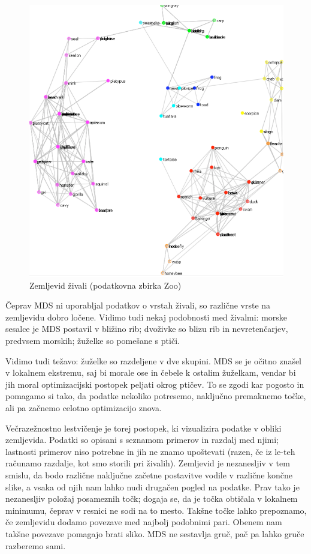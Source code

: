 \begin{figure}[tbp]
\begin{center}
\includegraphics{slike/zoo-mds.pdf}
\caption{Zemljevid živali (podatkovna zbirka Zoo)}
\label{f-zoo-mds}
\end{center}
\end{figure}

Čeprav MDS ni uporabljal podatkov o vrstah živali, so različne vrste na zemljevidu dobro ločene. Vidimo tudi nekaj podobnosti med živalmi: morske sesalce je MDS postavil v bližino rib; dvoživke so blizu rib in nevretenčarjev, predvsem morskih; žuželke so pomešane s ptiči.

Vidimo tudi težavo: žuželke so razdeljene v dve skupini. MDS se je očitno znašel v lokalnem ekstremu, saj bi morale ose in čebele k ostalim žuželkam, vendar bi jih moral optimizacijski postopek peljati okrog ptičev. To se zgodi kar pogosto in pomagamo si tako, da podatke nekoliko potresemo, naključno premaknemo točke, ali pa začnemo celotno optimizacijo znova.

Večrazežnostno lestvičenje je torej postopek, ki vizualizira podatke v obliki zemljevida. Podatki so opisani s seznamom primerov in razdalj med njimi; lastnosti primerov niso potrebne in jih ne znamo upoštevati (razen, če iz le-teh računamo razdalje, kot smo storili pri živalih). Zemljevid je nezanesljiv v tem smislu, da bodo različne naključne začetne postavitve vodile v različne končne slike, a vsaka od njih nam lahko nudi drugačen pogled na podatke. Prav tako je nezanesljiv položaj posameznih točk; dogaja se, da je točka obtičala v lokalnem minimumu, čeprav v resnici ne sodi na to mesto. Takšne točke lahko prepoznamo, če zemljevidu dodamo povezave med najbolj podobnimi pari. Obenem nam takšne povezave pomagajo brati sliko. MDS ne sestavlja gruč, pač pa lahko gruče razberemo sami.


